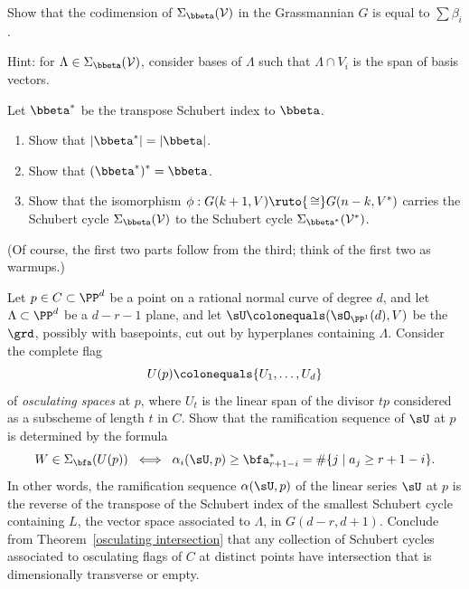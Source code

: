 \begin{exercise}\label{codim Schubert}
Show that the codimension of $\Sigma_{\bbeta}({\cal V})$ in the
Grassmannian $G$ is equal to $\sum \beta_i$.

Hint: for $\Lambda \in \Sigma_{\bbeta}({\cal V})$, consider bases of
$\Lambda$ such that $\Lambda \cap V_i$ is the span of basis vectors.
\end{exercise}

\begin{exercise}\label{Schubert duality}
Let ${\bbeta}^*$ be
the transpose Schubert index to $\bbeta$.
\begin{enumerate}
\item  Show that $|\bbeta^*| = |\bbeta|$.
\item Show that $(\bbeta^*){\vphantom{\bbeta}}^* = \bbeta$. %
\item Show that the isomorphism $\phi : G(k+1, V) \ruto{\,\cong} 
G(n-k, V^*)$ carries the Schubert cycle $\Sigma_\bbeta({\cal V})$ to the
Schubert cycle $\Sigma_{\bbeta^*}({\cal V}^*)$.
\end{enumerate}
(Of course, the first two parts follow from the third; think of the
first two as warmups.)
\end{exercise}

\begin{exercise}\label{osculating
planes}
Let $p\in C\subset \PP^{d}$ be a point on a rational normal curve of
degree $d$, and
let $\Lambda\subset \PP^{d}$ be a $d-r-1$ plane, and let  $\sU
\colonequals (\sO_{\PP^{1}}(d), V)$
be
the  $\grd$,  possibly with basepoints, cut out by hyperplanes containing
$\Lambda$.
Consider the complete flag
$$
U(p) \colonequals  \{U_{1}, \dots, U_{d}\}
$$
of \emph{osculating spaces} at $p$, where $U_{t}$ is the linear span of
%
the divisor $tp$ considered
as a subscheme of length $t$ in $C$. Show that the ramification sequence
of $\sU$ at $p$
is determined by the formula
$$
W \in \Sigma_{\bfa}(U(p))
\; \iff \; \alpha_i(\sU, p) \geq \bfa^*_{r+1-i} = \#\{j\mid a_j\geq
r+1-i\}.
$$
In other words, the ramification sequence $\alpha(\sU, p)$ of the linear
series $\sU$ at $p$ is the reverse of the transpose of the Schubert
index of the smallest Schubert cycle containing $L$, the vector
space associated to $\Lambda$, in  $G(d-r, d+1)$. Conclude from
Theorem~\ref{osculating intersection}
that any collection of Schubert cycles associated to osculating flags
of $C$ at distinct points have intersection
that is dimensionally transverse or empty.
\end{exercise}


